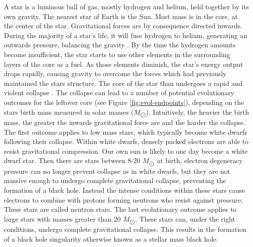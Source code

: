 A star is a luminous ball of gas, mostly hydrogen and helium, held together by its own gravity. The nearest star of Earth is the Sun. Most mass is in the core, at the center of the star. Gravitational forces are by consequence directed inwards. During the majority of a star's life, it will fuse hydrogen to helium, generating an outwards pressure, balancing the gravity \citep{ghosh}. By the time the hydrogen amounts become insufficient, the star starts to use other elements in the surrounding layers of the core as a fuel. As those elements diminish, the star's energy output drops rapidly, causing gravity to overcome the forces which had previously maintained the stars structure. The core of the star than undergoes a rapid and violent collapse \citep{ghosh}. The collapse can lead to a number of potential evolutionary outcomes for the leftover core (see Figure \ref{fig:evol-endpoints}), depending on the stars birth mass measured in solar masses ($M_{\bigodot}$). Intuitively, the heavier the birth mass, the greater the inwards gravitational force are and the harder the collapse. The first outcome applies to low mass stars, which typically become white dwarfs following their collapse. Within white dwarfs, densely packed electrons are able to resist gravitational compression. Our own sun is likely to one day become a white dwarf star. Then there are stars between 8-20 $M_{\bigodot}$ at birth, electron degeneracy pressure can no longer prevent collapse as in white dwarfs, but they are not massive enough to undergo complete gravitational collapse, preventing the formation of a black hole. Instead the intense conditions within these stars cause electrons to combine with protons forming neutrons who resist against pressure; These stars are called neutron stars. The last evolutionary outcome applies to large stars with masses greater than 20 $M_{\bigodot}$. These stars can, under the right conditions, undergo complete gravitational collapse. This results in the formation of a black hole singularity otherwise known as a stellar mass black hole. 

